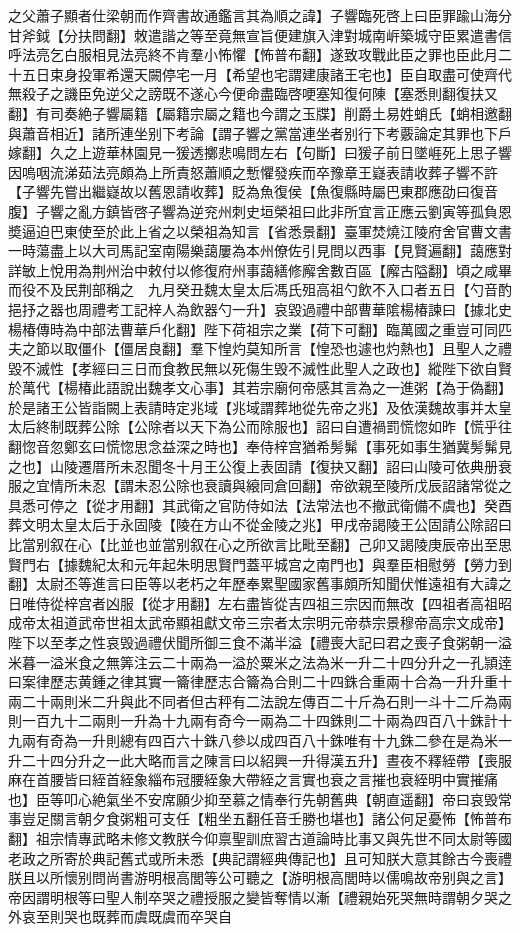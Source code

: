 之父蕭子顯者仕梁朝而作齊書故通鑑言其為順之諱】子響臨死啓上曰臣罪踰山海分甘斧鉞【分扶問翻】敇遣諧之等至竟無宣旨便建旗入津對城南㟁築城守臣累遣書信呼法亮乞白服相見法亮終不肯羣小怖懼【怖普布翻】遂致攻戰此臣之罪也臣此月二十五日束身投軍希還天闕停宅一月【希望也宅謂建康諸王宅也】臣自取盡可使齊代無殺子之譏臣免逆父之謗既不遂心今便命盡臨啓哽塞知復何陳【塞悉則翻復扶又翻】有司奏絶子響屬籍【屬籍宗屬之籍也今謂之玉牒】削爵土易姓蛸氏【蛸相邀翻與蕭音相近】諸所連坐别下考論【謂子響之黨當連坐者别行下考覈論定其罪也下戶嫁翻】久之上遊華林園見一猨透擲悲鳴問左右【句斷】曰猨子前日墜崕死上思子響因嗚咽流涕茹法亮頗為上所責怒蕭順之慙懼發疾而卒豫章王嶷表請收葬子響不許【子響先嘗出繼嶷故以舊恩請收葬】貶為魚復侯【魚復縣時屬巴東郡應劭曰復音腹】子響之亂方鎮皆啓子響為逆兖州刺史垣榮祖曰此非所宜言正應云劉寅等孤負恩奬逼迫巴東使至於此上省之以榮祖為知言【省悉景翻】臺軍焚燒江陵府舍官曹文書一時蕩盡上以大司馬記室南陽樂藹屢為本州僚佐引見問以西事【見賢遍翻】藹應對詳敏上悅用為荆州治中敕付以修復府州事藹繕修廨舍數百區【廨古隘翻】頃之咸畢而役不及民荆部稱之　九月癸丑魏太皇太后馮氏殂高祖勺飲不入口者五日【勺音酌挹抒之器也周禮考工記梓人為飲器勺一升】哀毀過禮中部曹華隂楊椿諫曰【據北史楊椿傳時為中部法曹華戶化翻】陛下荷祖宗之業【荷下可翻】臨萬國之重豈可同匹夫之節以取僵仆【僵居良翻】羣下惶灼莫知所言【惶恐也遽也灼熱也】且聖人之禮毀不滅性【孝經曰三日而食教民無以死傷生毁不滅性此聖人之政也】縱陛下欲自賢於萬代【楊椿此語說出魏孝文心事】其若宗廟何帝感其言為之一進粥【為于偽翻】於是諸王公皆詣闕上表請時定兆域【兆域謂葬地從先帝之兆】及依漢魏故事并太皇太后終制既葬公除【公除者以天下為公而除服也】詔曰自遭禍罰慌惚如昨【慌乎往翻惚音忽鄭玄曰慌惚思念益深之時也】奉侍梓宫猶希髣髴【事死如事生猶冀髣髴見之也】山陵遷厝所未忍聞冬十月王公復上表固請【復抉又翻】詔曰山陵可依典册衰服之宜情所未忍【謂未忍公除也衰讀與縗同倉回翻】帝欲親至陵所戊辰詔諸常從之具悉可停之【從才用翻】其武衛之官防侍如法【法常法也不撤武衛備不虞也】癸酉葬文明太皇太后于永固陵【陵在方山不從金陵之兆】甲戌帝謁陵王公固請公除詔曰比當别叙在心【比並也並當别叙在心之所欲言比毗至翻】己卯又謁陵庚辰帝出至思賢門右【據魏紀太和元年起朱明思賢門蓋平城宫之南門也】與羣臣相慰勞【勞力到翻】太尉丕等進言曰臣等以老朽之年歷奉累聖國家舊事頗所知聞伏惟遠祖有大諱之日唯侍從梓宫者凶服【從才用翻】左右盡皆從吉四祖三宗因而無改【四祖者高祖昭成帝太祖道武帝世祖太武帝顯祖獻文帝三宗者太宗明元帝恭宗景穆帝高宗文成帝】陛下以至孝之性哀毁過禮伏聞所御三食不滿半溢【禮喪大記曰君之喪子食粥朝一溢米暮一溢米食之無筭注云二十兩為一溢於粟米之法為米一升二十四分升之一孔頴逹曰案律歷志黄鍾之律其實一籥律歷志合籥為合則二十四銖合重兩十合為一升升重十兩二十兩則米二升與此不同者但古秤有二法說左傳百二十斤為石則一斗十二斤為兩則一百九十二兩則一升為十九兩有奇今一兩為二十四銖則二十兩為四百八十銖計十九兩有奇為一升則總有四百六十銖八參以成四百八十銖唯有十九銖二參在是為米一升二十四分升之一此大略而言之陳言曰以紹興一升得漢五升】晝夜不釋絰帶【喪服麻在首腰皆曰絰首絰象緇布冠腰絰象大帶絰之言實也衰之言摧也衰絰明中實摧痛也】臣等叩心絶氣坐不安席願少抑至慕之情奉行先朝舊典【朝直遥翻】帝曰哀毁常事豈足關言朝夕食粥粗可支任【粗坐五翻任音壬勝也堪也】諸公何足憂怖【怖普布翻】祖宗情專武略未修文教朕今仰禀聖訓庶習古道論時比事又與先世不同太尉等國老政之所寄於典記舊式或所未悉【典記謂經典傳記也】且可知朕大意其餘古今喪禮朕且以所懷别問尚書游明根高閭等公可聽之【游明根高閭時以儒鳴故帝别與之言】帝因謂明根等曰聖人制卒哭之禮授服之變皆奪情以漸【禮親始死哭無時謂朝夕哭之外哀至則哭也既葬而虞既虞而卒哭自